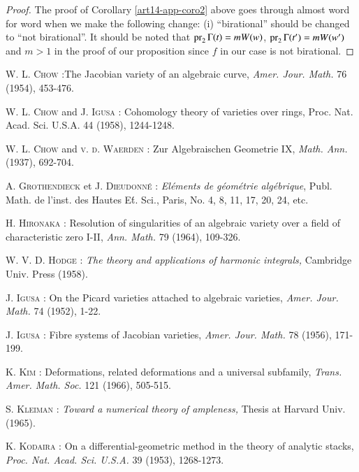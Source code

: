 \begin{proof}
The proof of Corollary \ref{art14-app-coro2} above goes through almost word for word when we make the following change: (i) ``birational'' should be changed to ``not birational''. It should be noted that $\operatorname{\mathrm{pr}}_{2}\Gamma(t)=mW(w)$, $\operatorname{\mathrm{pr}}_{2}\Gamma(t')=mW(w')$ and $m>1$ in the proof of our proposition since $f$ in our case is not birational.
\end{proof}

\begin{thebibliography}{99}
 \textsc{W. L. Chow :}\pageoriginale The Jacobian variety of an algebraic curve, {\em Amer. Jour. Math.} 76 (1954), 453-476.

 \textsc{W. L. Chow} and \textsc{J. Igusa :} Cohomology theory of varieties over rings, {\rm Proc. Nat. Acad. Sci. U.S.A.} 44 (1958), 1244-1248.

 \textsc{W. L. Chow} and \textsc{v. d. Waerden :} Zur Algebraischen Geometrie IX, {\em Math. Ann.} (1937), 692-704.

 \textsc{A. Grothendieck} et \textsc{J. Dieudonn\'e :} {\em El\'ements de g\'eom\'etrie alg\'ebrique}, Publ. Math. de l'inst. des Hautes E\'t. Sci., Paris, No. 4, 8, 11, 17, 20, 24, etc.

 \textsc{H. Hironaka :} Resolution of singularities of an algebraic variety over a field of characteristic zero I-II, {\em Ann. Math.} 79 (1964), 109-326.

 \textsc{W. V. D. Hodge :} {\em The theory and applications of harmonic integrals,} Cambridge Univ. Press (1958).

 \textsc{J. Igusa :} On the Picard varieties attached to algebraic varieties, {\em Amer. Jour. Math.} 74 (1952), 1-22.

 \textsc{J. Igusa :} Fibre systems of Jacobian varieties, {\em Amer. Jour. Math.} 78 (1956), 171-199.

 \textsc{K. Kim :} Deformations, related deformations and a universal subfamily, {\em Trans. Amer. Math. Soc.} 121 (1966), 505-515.

 \textsc{S. Kleiman :} {\em Toward a numerical theory of ampleness,} Thesis at Harvard Univ. (1965).

 \textsc{K. Kodaira :} On a differential-geometric method in the theory of analytic stacks, {\em Proc. Nat. Acad. Sci. U.S.A.} 39 (1953), 1268-1273.


\end{thebibliography}
